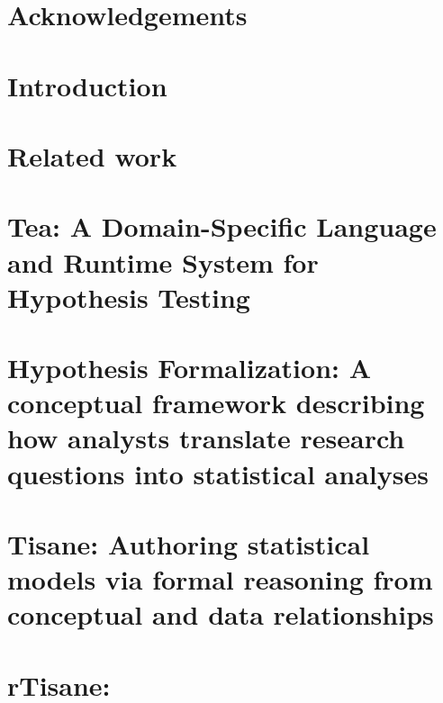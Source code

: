 \documentclass[11pt]{book}
\begin{document}
% 





{} %



\chapter*{Acknowledgements}



\tableofcontents{}
\listoffigures
\listoftables
\clearpage

\chapter {Introduction}


\chapter {Related work}


\chapter{Tea: A Domain-Specific Language and Runtime System for Hypothesis Testing} %
\label{chapter:tea}


\chapter{Hypothesis Formalization: A conceptual framework describing how analysts translate research questions into statistical analyses} %
\label{chapter:hypoForm}


\chapter{Tisane: Authoring statistical models via formal reasoning from conceptual and data relationships}
\label{chapter:tisane}


\chapter{rTisane: }
\label{chapter:rTisane}

\end{document}
